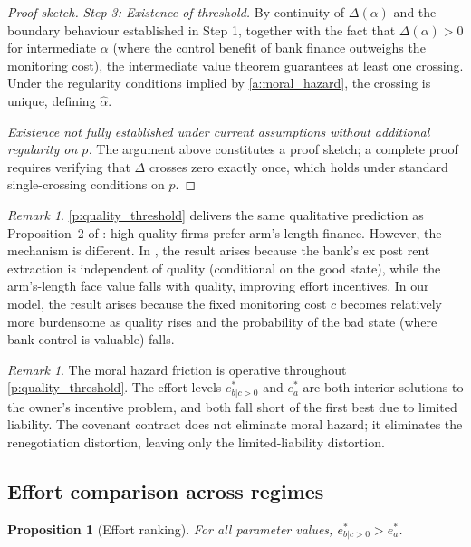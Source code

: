 \documentclass[12pt,a4paper]{article}
\theoremstyle{plain}
\newtheorem{proposition}[theorem]{Proposition}
\theoremstyle{definition}
\theoremstyle{remark}
\newtheorem{remark}[theorem]{Remark}
\begin{document}
\begin{proof}[Proof sketch]
\emph{Step 3: Existence of threshold.} By continuity of $\Delta(\alpha)$ and the
boundary behaviour established in Step 1, together with the fact that $\Delta(\alpha)
> 0$ for intermediate $\alpha$ (where the control benefit of bank finance outweighs
the monitoring cost), the intermediate value theorem guarantees at least one crossing.
Under the regularity conditions implied by \cref{a:moral_hazard}, the crossing is
unique, defining $\hat{\alpha}$.

\emph{Existence not fully established under current assumptions without additional
regularity on $p$.} The argument above constitutes a proof sketch; a complete proof
requires verifying that $\Delta$ crosses zero exactly once, which holds under standard
single-crossing conditions on $p$.
\end{proof}

\begin{remark}
\label{r:direction_comparison}
\cref{p:quality_threshold} delivers the same qualitative prediction as Proposition~2
of \citet{Rajan1992}: high-quality firms prefer arm's-length finance. However, the
mechanism is different. In \citet{Rajan1992}, the result arises because the bank's
ex post rent extraction is independent of quality (conditional on the good state),
while the arm's-length face value falls with quality, improving effort incentives. In
our model, the result arises because the fixed monitoring cost $c$ becomes relatively
more burdensome as quality rises and the probability of the bad state (where bank
control is valuable) falls.
\end{remark}

\begin{remark}
\label{r:moral_hazard_in_source_choice}
The moral hazard friction is operative throughout \cref{p:quality_threshold}. The
effort levels $e^*_{b|c>0}$ and $e^*_a$ are both interior solutions to the owner's
incentive problem, and both fall short of the first best due to limited liability.
The covenant contract does not eliminate moral hazard; it eliminates the renegotiation
distortion, leaving only the limited-liability distortion.
\end{remark}

\subsection{Effort comparison across regimes}
\label{subsec:effort_comparison}

\begin{proposition}[Effort ranking]
\label{p:effort_ranking}
For all parameter values, $e^*_{b|c>0} > e^*_a$.
\end{proposition}
\end{document}
